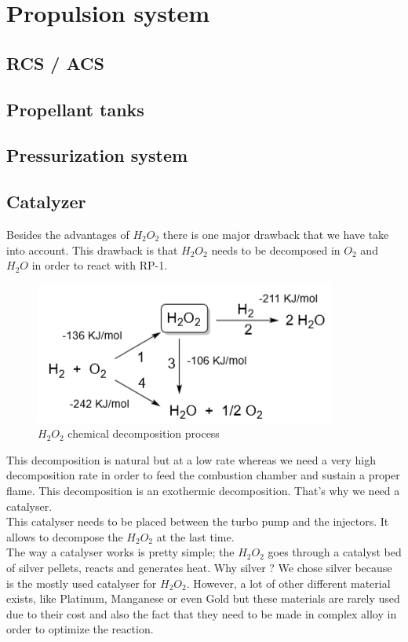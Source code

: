 \chapter{Propulsion system}
\section{RCS / ACS}
\section{Propellant tanks}
\section{Pressurization system}
\section{Catalyzer}
Besides the advantages of $H_2O_2$ there is one major drawback that we have take into account. This drawback is that $H_2O_2$ needs to be decomposed in $O_2$ and $H_2O$ in order to react with RP-1. 

\begin{figure}[H]
	\centering
	\includegraphics{H2O2}
	\caption{$H_2O_2$ chemical decomposition process}
\end{figure}

This decomposition is natural but at a low rate whereas we need a very high decomposition rate in order to feed the combustion chamber and sustain a proper flame. This decomposition is an exothermic decomposition. That's why we need a catalyser. \\

This catalyser needs to be placed between the turbo pump and the injectors. It allows to decompose the $H_2O_2$ at the last time. \\

The way a catalyser works is pretty simple; the $H_2O_2$ goes through a catalyst bed of silver pellets, reacts and generates heat. 
Why silver ? We chose silver because is the mostly used catalyser for $H_2O_2$. However, a lot of other different material exists, like Platinum, Manganese or even Gold but these materials are rarely used due to their cost and also the fact that they need to be made in complex alloy in order to optimize the reaction. 


